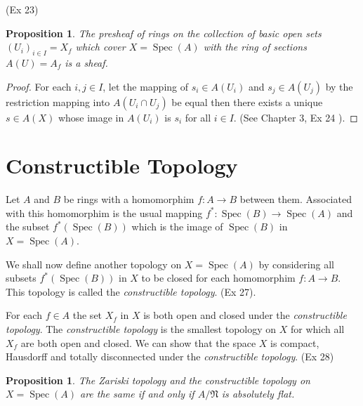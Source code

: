 \documentclass[]{report}
\newtheorem{prop}[theorem]{Proposition}
\DeclareMathOperator\Spec{Spec}
\newcommand\mfk[1]{\mathfrak{#1}}
\begin{document}
    (Ex 23)

\begin{prop}
    The presheaf of rings on the collection of basic open sets $(U_i)_{i \in I} = X_f$ which cover $X = \Spec(A)$ with the ring of sections $A(U) = A_f$ is a \textit{sheaf}. 
\end{prop}

\begin{proof}
    For each $i,j \in I$, let the mapping of $s_i \in A(U_i)$ and $s_j \in A(U_j)$ by the restriction mapping into $A(U_i \cap U_j)$ be equal then there exists a unique $s \in A(X)$ whose image in $A(U_i)$ is $s_i$ for all $i \in I$. (See Chapter 3, Ex 24 \cite{atiyah1}). 
\end{proof}


\section{Constructible Topology}

Let $A$ and $B$ be rings with a homomorphim $f: A \rightarrow B$ between them. Associated with this homomorphim is the usual mapping $f^*: \Spec(B) \rightarrow \Spec(A)$ and the subset $f^*(\Spec(B))$ which is the image of $\Spec(B)$ in $X = \Spec(A)$.

We shall now define another topology on $X = \Spec(A)$ by considering all subsets $f^*(\Spec(B))$ in $X$ to be closed for each homomorphim $f: A \rightarrow B$. This topology is called the \textit{constructible topology}. (Ex 27).

For each $f \in A$ the set $X_f$ in $X$ is both open and closed under the \textit{constructible topology}. The \textit{constructible topology} is the smallest topology on $X$ for which all $X_f$ are both open and closed. We can show that the space $X$ is compact, Hausdorff and totally disconnected under the \textit{constructible topology}. (Ex 28)

\begin{prop}
    The Zariski topology and the constructible topology on $X = \Spec(A)$ are the same if and only if $A/\mfk{N}$ is \textit{absolutely flat}.
\end{prop}
\end{document}
